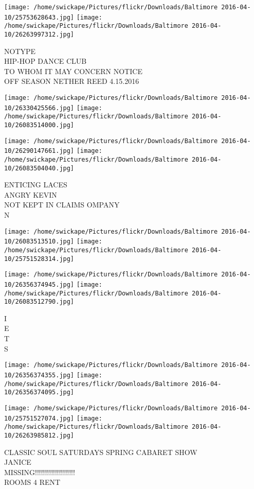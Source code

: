 \documentclass[10pt,letterpaper]{article}
\begin{document}
\texttt{[image: /home/swickape/Pictures/flickr/Downloads/Baltimore 2016-04-10/25753628643.jpg]}
\texttt{[image: /home/swickape/Pictures/flickr/Downloads/Baltimore 2016-04-10/26263997312.jpg]}

NOTYPE\\
HIP{-}HOP DANCE CLUB\\
TO WHOM IT MAY CONCERN NOTICE\\
OFF SEASON NETHER REED 4.15.2016
\pagebreak

\texttt{[image: /home/swickape/Pictures/flickr/Downloads/Baltimore 2016-04-10/26330425566.jpg]}
\texttt{[image: /home/swickape/Pictures/flickr/Downloads/Baltimore 2016-04-10/26083514000.jpg]}

\texttt{[image: /home/swickape/Pictures/flickr/Downloads/Baltimore 2016-04-10/26290147661.jpg]}
\texttt{[image: /home/swickape/Pictures/flickr/Downloads/Baltimore 2016-04-10/26083504040.jpg]}

ENTICING LACES\\
ANGRY KEVIN\\
NOT KEPT IN CLAIMS OMPANY\\
N
\pagebreak

\texttt{[image: /home/swickape/Pictures/flickr/Downloads/Baltimore 2016-04-10/26083513510.jpg]}
\texttt{[image: /home/swickape/Pictures/flickr/Downloads/Baltimore 2016-04-10/25751528314.jpg]}

\texttt{[image: /home/swickape/Pictures/flickr/Downloads/Baltimore 2016-04-10/26356374945.jpg]}
\texttt{[image: /home/swickape/Pictures/flickr/Downloads/Baltimore 2016-04-10/26083512790.jpg]}

I\\
E\\
T\\
S
\pagebreak

\texttt{[image: /home/swickape/Pictures/flickr/Downloads/Baltimore 2016-04-10/26356374355.jpg]}
\texttt{[image: /home/swickape/Pictures/flickr/Downloads/Baltimore 2016-04-10/26356374095.jpg]}

\texttt{[image: /home/swickape/Pictures/flickr/Downloads/Baltimore 2016-04-10/25751527074.jpg]}
\texttt{[image: /home/swickape/Pictures/flickr/Downloads/Baltimore 2016-04-10/26263985812.jpg]}

CLASSIC SOUL SATURDAYS SPRING CABARET SHOW\\
JANICE\\
MISSING!!!!!!!!!!!!!!!!!!!!\\
ROOMS 4 RENT
\pagebreak
\end{document}
